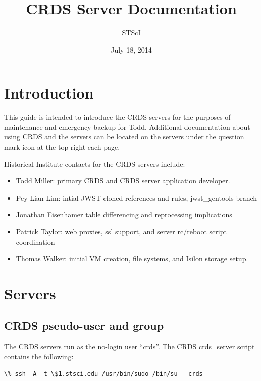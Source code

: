 \documentclass[letterpaper,10pt,english]{sphinxmanual}
\title{CRDS Server Documentation}
\date{July 18, 2014}
\author{STScI}
\begin{document}
\maketitle
\tableofcontents
{}\label{index::doc}



\chapter{Introduction}
\label{server_guide:introduction}\label{server_guide::doc}\label{server_guide:crds-server-guide}
This guide is intended to introduce the CRDS servers for the purposes of maintenance and emergency backup for Todd.
Additional documentation about using CRDS and the servers can be located on the servers under the question mark icon
at the top right each page.

Historical Institute contacts for the CRDS servers include:
\begin{itemize}
\item {} 
Todd Miller:         primary CRDS and CRDS server application developer.

\item {} 
Pey-Lian Lim:        intial JWST cloned references and rules, jwst\_gentools branch

\item {} 
Jonathan Eisenhamer  table differencing and reprocessing implications

\item {} 
Patrick Taylor:      web proxies, ssl support, and server rc/reboot script coordination

\item {} 
Thomas Walker:       initial VM creation, file systems, and Isilon storage setup.

\end{itemize}


\chapter{Servers}
\label{server_guide:servers}

\section{CRDS pseudo-user and group}
\label{server_guide:crds-pseudo-user-and-group}
The CRDS servers run as the no-login user ``crds''.  The CRDS  crds\_server script contains the following:

\begin{Verbatim}[commandchars=\\\{\}]
\% ssh -A -t \$1.stsci.edu /usr/bin/sudo /bin/su - crds
\end{Verbatim}
\end{document}
